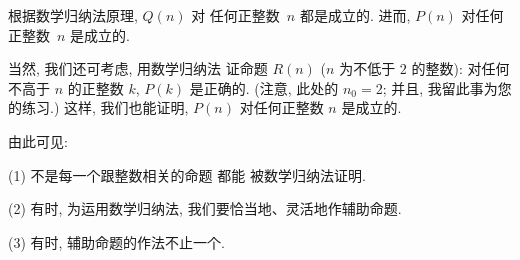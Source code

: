 \documentclass[%
    UTF8,%
    fontset=none,%
    punct=kaiming,%
    zihao=-4,%
    a4paper,%
    oneside,%
]{ctexbook}
\let\emph\relax
\begin{document}
\begin{example}
    根据数学归纳法原理, \(Q(n)\) 对%
    任何正整数~\(n\) 都是成立的.
    进而, \(P(n)\) 对任何正整数~\(n\) 是成立的.

    当然, 我们还可考虑, 用数学归纳法%
    证命题 \(R(n)\)
    (\(n\) 为不低于 \(2\) 的整数):
    对任何不高于 \(n\) 的正整数 \(k\),
    \(P(k)\) 是正确的.
    (注意, 此处的 \(n_0 = 2\);
    并且, 我留此事为您的练习.)
    这样, 我们也能证明,
    \(P(n)\) 对任何正整数 \(n\) 是成立的.

    由此可见:

    (1)
    不是每一个跟整数相关的命题%
    都能\emph{直接地}%
    被数学归纳法证明.

    (2)
    有时, 为运用数学归纳法,
    我们要恰当地、灵活地作辅助命题.

    (3)
    有时, 辅助命题的作法不止一个.
\end{example}
\end{document}
